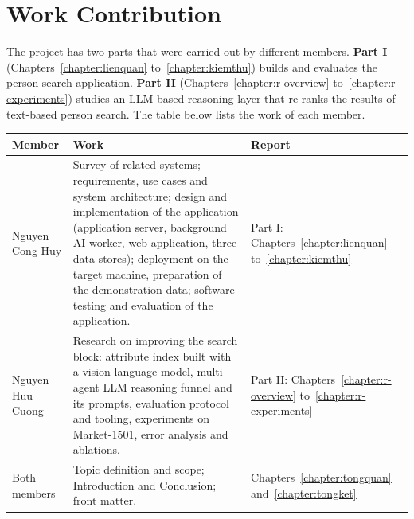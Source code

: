 \chapter*{Work Contribution}

The project has two parts that were carried out by different members. \textbf{Part I} (Chapters~\ref{chapter:lienquan} to~\ref{chapter:kiemthu}) builds and evaluates the person search application. \textbf{Part II} (Chapters~\ref{chapter:r-overview} to~\ref{chapter:r-experiments}) studies an LLM-based reasoning layer that re-ranks the results of text-based person search. The table below lists the work of each member.

\begin{table}[H]
\centering
\begin{tabularx}{\textwidth}{|>{\raggedright\arraybackslash}p{4.0cm}|L|>{\raggedright\arraybackslash}p{3.2cm}|}
\hline
\textbf{Member} & \textbf{Work} & \textbf{Report} \\
\hline
Nguyen Cong Huy  &
Survey of related systems; requirements, use cases and system architecture; design and implementation of the application (application server, background AI worker, web application, three data stores); deployment on the target machine, preparation of the demonstration data; software testing and evaluation of the application. &
Part I: Chapters~\ref{chapter:lienquan} to~\ref{chapter:kiemthu} \\
\hline
Nguyen Huu Cuong  &
Research on improving the search block: attribute index built with a vision-language model, multi-agent LLM reasoning funnel and its prompts, evaluation protocol and tooling, experiments on Market-1501, error analysis and ablations. &
Part II: Chapters~\ref{chapter:r-overview} to~\ref{chapter:r-experiments} \\
\hline
Both members &
Topic definition and scope; Introduction and Conclusion; front matter. &
Chapters~\ref{chapter:tongquan} and~\ref{chapter:tongket} \\
\hline
\end{tabularx}
\end{table}
